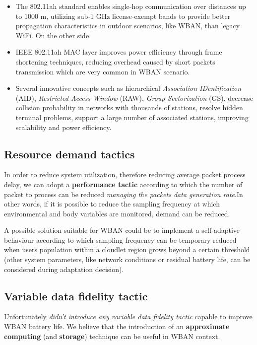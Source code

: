 \documentclass[sigchi]{acmart}
\begin{document}
\begin{itemize}
\item The 802.11ah standard enables single-hop communication over distances up to $1000$ m, utilizing sub-1 GHz license-exempt bands to provide better propagation characteristics in outdoor scenarios, like WBAN, than legacy WiFi. On the other side

\item IEEE 802.11ah MAC layer improves power efficiency through frame shortening techniques, reducing overhead caused by short packets transmission which are very common in WBAN scenario.

\item Several innovative concepts such as hierarchical \textit{Association IDentification} (AID), \textit{Restricted Access Window} (RAW), \textit{Group Sectorization} (GS), decrease collision probability in networks with thousands of stations, resolve hidden terminal problems, support a large number of associated stations, improving scalability and power efficiency.

\end{itemize}

\subsection{Resource demand tactics}

In order to reduce system utilization, therefore reducing average packet process delay, we can adopt a \textbf{performance tactic} according to which the number of packet to process can be reduced \textit{managing the packets data generation rate}.In other words, if it is possible to reduce the sampling frequency at which environmental and body variables are monitored, demand can be reduced.\cite{BassSoftwareArchitecture2003} 

A possible solution suitable for WBAN could be to implement a self-adaptive behaviour according to which sampling frequency can be temporary reduced when users population within a cloudlet region grows beyond a certain threshold (other system parameters, like network conditions or residual battery life, can  be considered during adaptation decision).


\subsection{Variable data fidelity tactic}

Unfortunately \citet{MSAReport} \textit{didn't introduce any variable data fidelity tactic} capable to improve WBAN battery life. We believe that the introduction of an \textbf{approximate computing} (and \textbf{storage}) technique can be useful in WBAN context. 
\end{document}

